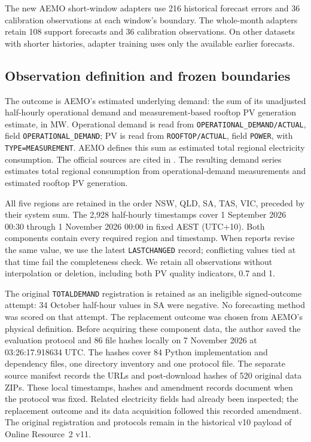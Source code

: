 The new AEMO short-window adapters use 216 historical forecast errors and
36 calibration observations at each window's boundary. The whole-month
adapters retain 108 support forecasts and 36 calibration observations.
On other datasets with shorter histories, adapter training uses only
the available earlier forecasts.

\FloatBarrier

\subsection{Observation definition and frozen boundaries}
The outcome is AEMO's estimated underlying demand: the sum of its
unadjusted half-hourly operational demand and measurement-based rooftop
PV generation estimate, in MW. Operational demand is read from
\texttt{OPERATIONAL\_DEMAND/ACTUAL}, field
\texttt{OPERATIONAL\_DEMAND}; PV is read from
\texttt{ROOFTOP/ACTUAL}, field \texttt{POWER}, with
\texttt{TYPE=MEASUREMENT}. AEMO defines this sum as estimated total
regional electricity consumption. The official sources are cited in
. The resulting demand series estimates total regional consumption from
operational-demand measurements and estimated rooftop PV generation.

All five regions are retained in the order NSW, QLD, SA, TAS, VIC,
preceded by their system sum. The 2,928 half-hourly timestamps cover
1 September 2026 00:30 through 1 November 2026 00:00 in fixed AEST
(UTC+10). Both components contain every required region and timestamp. When
reports revise the same value, we use the latest \texttt{LASTCHANGED}
record; conflicting values tied at that time fail the completeness
check. We retain all observations without interpolation or deletion,
including both PV quality indicators, 0.7 and 1.

The original \texttt{TOTALDEMAND} registration is retained as an
ineligible signed-outcome attempt: 34 October half-hour values in SA
were negative. No forecasting method was scored on that attempt.
The replacement outcome was chosen from AEMO's physical definition.
Before acquiring these component data, the author saved the evaluation
protocol and 86 file hashes locally on 7 November 2026 at
03:26:17.918634 UTC. The hashes cover 84 Python implementation and
dependency files, one directory inventory and one protocol file.
The separate source manifest records the URLs and post-download hashes
of 520 original data ZIPs. These local timestamps, hashes and amendment records document when the
protocol was fixed. Related electricity fields had already been inspected;
the replacement outcome and its data acquisition followed this recorded
amendment.
The original registration and protocols remain in the historical v10 payload of Online Resource~2 v11.

